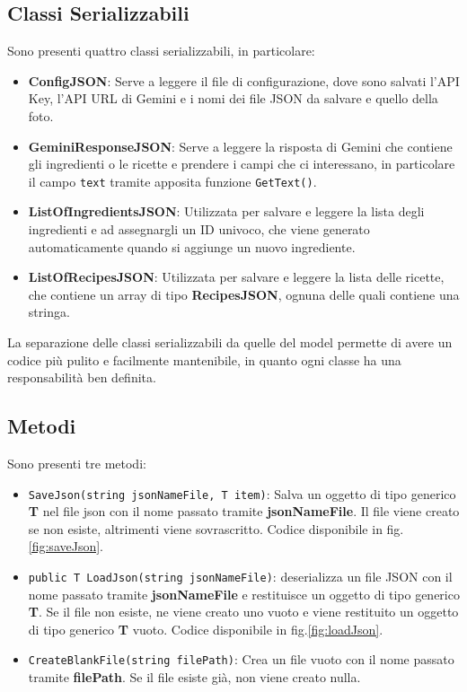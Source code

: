 \subsection{Classi Serializzabili}
Sono presenti quattro classi serializzabili, in particolare:
\begin{itemize}
    \item \textbf{ConfigJSON}: Serve a leggere il file di configurazione, dove sono salvati l'API Key, l'API URL di Gemini e i nomi dei file JSON da salvare e quello della foto.
    \item \textbf{GeminiResponseJSON}: Serve a leggere la risposta di Gemini che contiene gli ingredienti o le ricette e prendere i campi che ci interessano, in particolare il campo \texttt{text} tramite apposita funzione \texttt{GetText()}.
    \item \textbf{ListOfIngredientsJSON}: Utilizzata per salvare e leggere la lista degli ingredienti e ad assegnargli un ID univoco, che viene generato automaticamente quando si aggiunge un nuovo ingrediente.
    \item \textbf{ListOfRecipesJSON}: Utilizzata per salvare e leggere la lista delle ricette, che contiene un array di tipo \textbf{RecipesJSON}, ognuna delle quali contiene una stringa.
\end{itemize}

La separazione delle classi serializzabili da quelle del model permette di avere un codice più pulito e facilmente mantenibile, in quanto ogni classe ha una responsabilità ben definita.

\subsection{Metodi}
Sono presenti tre metodi:
\begin{itemize}
    \item \texttt{SaveJson(string jsonNameFile, T item)}: Salva un oggetto di tipo generico \textbf{T} nel file json con il nome passato tramite \textbf{jsonNameFile}. Il file viene creato se non esiste, altrimenti viene sovrascritto. Codice disponibile in fig.\ref{fig:saveJson}.
    \item \texttt{public T LoadJson(string jsonNameFile)}: deserializza un file JSON con il nome passato tramite \textbf{jsonNameFile} e restituisce un oggetto di tipo generico \textbf{T}. Se il file non esiste, ne viene creato uno vuoto e viene restituito un oggetto di tipo generico \textbf{T} vuoto. Codice disponibile in fig.\ref{fig:loadJson}.
    \item \texttt{CreateBlankFile(string filePath)}: Crea un file vuoto con il nome passato tramite \textbf{filePath}. Se il file esiste già, non viene creato nulla.
\end{itemize}

